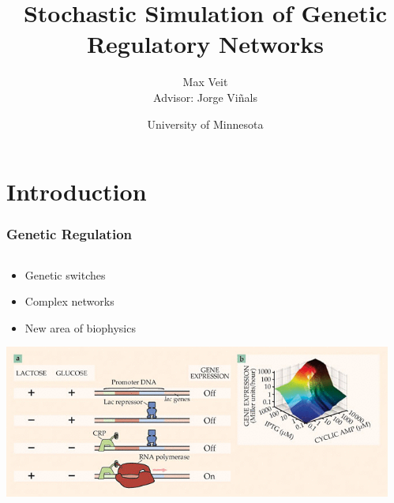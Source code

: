 \documentclass[xcolor={usenames,dvipsnames,svgnames},url=hyphens]{beamer}
\begin{document}
\title[Genetic Networks]{Stochastic Simulation of Genetic Regulatory Networks}
\author[Max Veit]{Max Veit\\Advisor: Jorge Viñals}
\date[2014-05-07{7 May 2014}
\institute[U of MN]{University of Minnesota}
\subject{Physics}

\frame{\titlepage}

\section{Introduction} %
\label{sec:introduction}
\begin{frame}
    \frametitle{Genetic Regulation}
    \begin{center}
    \end{center}
    \begin{columns}[c]
        \begin{column}[c]{0.7\textwidth}
            \begin{itemize}
                \item Genetic switches
                \item Complex networks
                \item New area of biophysics
            \end{itemize}
            \includegraphics[width=\textwidth]{ecoli-switch.png} \footnotesize{\cite{decision-making}}
        \end{column}
        \begin{column}[c]{0.3\textwidth}

\end{column}
\end{columns}
\end{frame}
\end{document}
